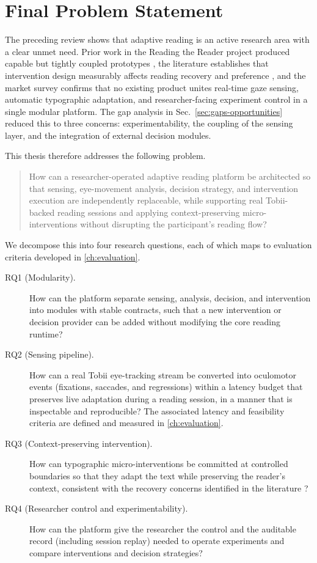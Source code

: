 \section{Final Problem Statement}
\label{sec:final-problem-statement}
The preceding review shows that adaptive reading is an active research area with a clear unmet need.
Prior work in the Reading the Reader project produced capable but tightly coupled prototypes \cite{refsgaard2024rtr, pereira2024typography, palinec2024reactive}, the literature establishes that intervention design measurably affects reading recovery and preference \cite{jensen2025context}, and the market survey confirms that no existing product unites real-time gaze sensing, automatic typographic adaptation, and researcher-facing experiment control in a single modular platform.
The gap analysis in Sec.~\ref{sec:gaps-opportunities} reduced this to three concerns: experimentability, the coupling of the sensing layer, and the integration of external decision modules.

This thesis therefore addresses the following problem.
\begin{quote}
How can a researcher-operated adaptive reading platform be architected so that sensing, eye-movement analysis, decision strategy, and intervention execution are independently replaceable, while supporting real Tobii-backed reading sessions and applying context-preserving micro-interventions without disrupting the participant's reading flow?
\end{quote}

We decompose this into four research questions, each of which maps to evaluation criteria developed in \cref{ch:evaluation}.

\begin{description}
    \item[RQ1 (Modularity).] How can the platform separate sensing, analysis, decision, and intervention into modules with stable contracts, such that a new intervention or decision provider can be added without modifying the core reading runtime?
    \item[RQ2 (Sensing pipeline).] How can a real Tobii eye-tracking stream be converted into oculomotor events (fixations, saccades, and regressions) within a latency budget that preserves live adaptation during a reading session, in a manner that is inspectable and reproducible? The associated latency and feasibility criteria are defined and measured in \cref{ch:evaluation}.
    \item[RQ3 (Context-preserving intervention).] How can typographic micro-interventions be committed at controlled boundaries so that they adapt the text while preserving the reader's context, consistent with the recovery concerns identified in the literature \cite{jensen2025context}?
    \item[RQ4 (Researcher control and experimentability).] How can the platform give the researcher the control and the auditable record (including session replay) needed to operate experiments and compare interventions and decision strategies?
\end{description}

